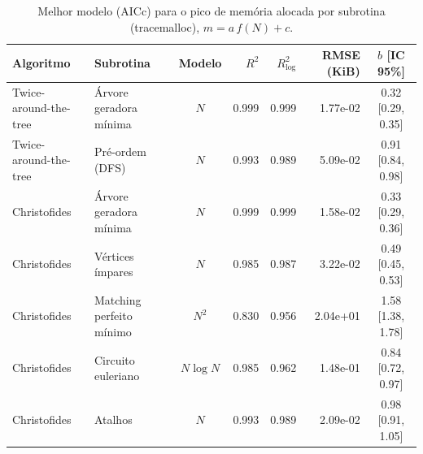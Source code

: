 \begin{table}[ht]
\centering
\small
\caption{Melhor modelo (AICc) para o pico de memória alocada por subrotina (tracemalloc), $m = a\,f(N) + c$.}
\label{tab:ajustes-memoria}
\begin{tabular}{llcrrrc}
\hline
Algoritmo & Subrotina & Modelo & $R^2$ & $R^2_{\log}$ & RMSE (KiB) & $b$ [IC 95\%] \\
\hline
Twice-around-the-tree & Árvore geradora mínima & $N$ & 0.999 & 0.999 & 1.77e-02 & 0.32 [0.29, 0.35] \\
Twice-around-the-tree & Pré-ordem (DFS) & $N$ & 0.993 & 0.989 & 5.09e-02 & 0.91 [0.84, 0.98] \\
Christofides & Árvore geradora mínima & $N$ & 0.999 & 0.999 & 1.58e-02 & 0.33 [0.29, 0.36] \\
Christofides & Vértices ímpares & $N$ & 0.985 & 0.987 & 3.22e-02 & 0.49 [0.45, 0.53] \\
Christofides & Matching perfeito mínimo & $N^2$ & 0.830 & 0.956 & 2.04e+01 & 1.58 [1.38, 1.78] \\
Christofides & Circuito euleriano & $N\log N$ & 0.985 & 0.962 & 1.48e-01 & 0.84 [0.72, 0.97] \\
Christofides & Atalhos & $N$ & 0.993 & 0.989 & 2.09e-02 & 0.98 [0.91, 1.05] \\
\hline
\end{tabular}
\end{table}